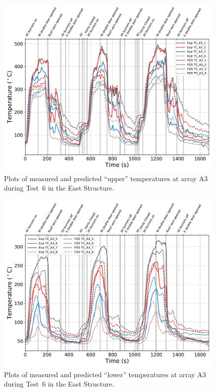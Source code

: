 \clearpage
\begin{figure}[p]
	\centering
	\includegraphics[width=\columnwidth]{Figures/Plots/Validation/Temperature/Test_6_TC_A3_upper}
	\caption{Plots of measured and predicted ``upper'' temperatures at array A3 during Test~6 in the East Structure.}
	\label{fig:TCA3_upper_data_Test6}
\end{figure}
\begin{figure}[p]
	\centering
	\includegraphics[width=\columnwidth]{Figures/Plots/Validation/Temperature/Test_6_TC_A3_lower}
	\caption{Plots of measured and predicted ``lower'' temperatures at array A3 during Test~6 in the East Structure.}
	\label{fig:TCA3_lower_data_Test6}
\end{figure}

